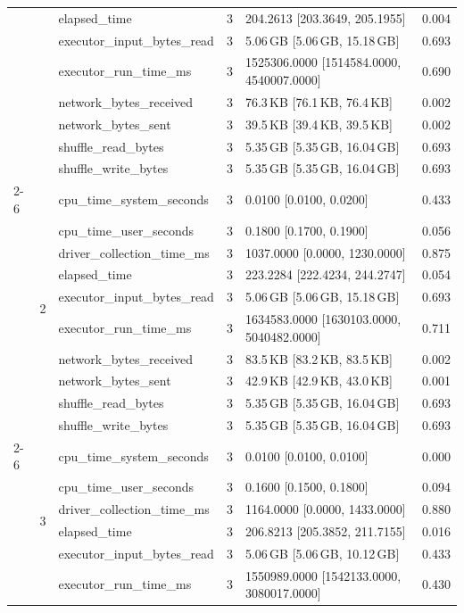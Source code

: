 \begin{tabular}{lllrll}
 &  & elapsed_time & 3 & 204.2613 [203.3649, 205.1955] & 0.004 \\
 &  & executor_input_bytes_read & 3 & 5.06\,GB [5.06\,GB, 15.18\,GB] & 0.693 \\
 &  & executor_run_time_ms & 3 & 1525306.0000 [1514584.0000, 4540007.0000] & 0.690 \\
 &  & network_bytes_received & 3 & 76.3\,KB [76.1\,KB, 76.4\,KB] & 0.002 \\
 &  & network_bytes_sent & 3 & 39.5\,KB [39.4\,KB, 39.5\,KB] & 0.002 \\
 &  & shuffle_read_bytes & 3 & 5.35\,GB [5.35\,GB, 16.04\,GB] & 0.693 \\
 &  & shuffle_write_bytes & 3 & 5.35\,GB [5.35\,GB, 16.04\,GB] & 0.693 \\
\cline{2-6}
 & \multirow[t]{10}{*}{2} & cpu_time_system_seconds & 3 & 0.0100 [0.0100, 0.0200] & 0.433 \\
 &  & cpu_time_user_seconds & 3 & 0.1800 [0.1700, 0.1900] & 0.056 \\
 &  & driver_collection_time_ms & 3 & 1037.0000 [0.0000, 1230.0000] & 0.875 \\
 &  & elapsed_time & 3 & 223.2284 [222.4234, 244.2747] & 0.054 \\
 &  & executor_input_bytes_read & 3 & 5.06\,GB [5.06\,GB, 15.18\,GB] & 0.693 \\
 &  & executor_run_time_ms & 3 & 1634583.0000 [1630103.0000, 5040482.0000] & 0.711 \\
 &  & network_bytes_received & 3 & 83.5\,KB [83.2\,KB, 83.5\,KB] & 0.002 \\
 &  & network_bytes_sent & 3 & 42.9\,KB [42.9\,KB, 43.0\,KB] & 0.001 \\
 &  & shuffle_read_bytes & 3 & 5.35\,GB [5.35\,GB, 16.04\,GB] & 0.693 \\
 &  & shuffle_write_bytes & 3 & 5.35\,GB [5.35\,GB, 16.04\,GB] & 0.693 \\
\cline{2-6}
 & \multirow[t]{10}{*}{3} & cpu_time_system_seconds & 3 & 0.0100 [0.0100, 0.0100] & 0.000 \\
 &  & cpu_time_user_seconds & 3 & 0.1600 [0.1500, 0.1800] & 0.094 \\
 &  & driver_collection_time_ms & 3 & 1164.0000 [0.0000, 1433.0000] & 0.880 \\
 &  & elapsed_time & 3 & 206.8213 [205.3852, 211.7155] & 0.016 \\
 &  & executor_input_bytes_read & 3 & 5.06\,GB [5.06\,GB, 10.12\,GB] & 0.433 \\
 &  & executor_run_time_ms & 3 & 1550989.0000 [1542133.0000, 3080017.0000] & 0.430 \\

\end{tabular}
